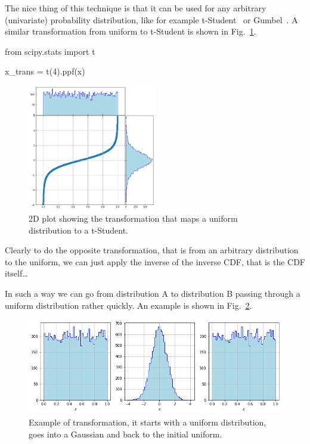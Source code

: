 The nice thing of this technique is that it can be used for any arbitrary (univariate) probability distribution, like for example t-Student~\cite{bib:t_student} or Gumbel~\cite{bib:gumbel}.
A similar transformation from uniform to t-Student is shown in Fig.~\ref{fig:uniform_to_tstudent}.

\begin{ipython}
from scipy.stats import t

x_trans = t(4).ppf(x)
\end{ipython}

\begin{figure}[htb]
  \centering
  \includegraphics[width=0.5\textwidth]{figures/tstudent_to_uniform}
  \caption{2D plot showing the transformation that maps a uniform distribution to a t-Student.}
  \label{fig:uniform_to_tstudent}
\end{figure}

Clearly to do the opposite transformation, that is from an arbitrary distribution
to the uniform, we can just apply the inverse of the inverse CDF, that is the CDF itself\ldots

In such a way we can go from distribution A to distribution B passing through 
a uniform distribution rather quickly. An example is shown in Fig.~\ref{fig:a_to_b_to_a}.

\begin{figure}[htbp]
	\centering
	\includegraphics[width=1.\textwidth]{figures/a_to_b_to_a}
	\caption{Example of transformation, it starts with a uniform distribution, 
		goes into a Gaussian and back to the initial uniform.}
	\label{fig:a_to_b_to_a}
\end{figure}

